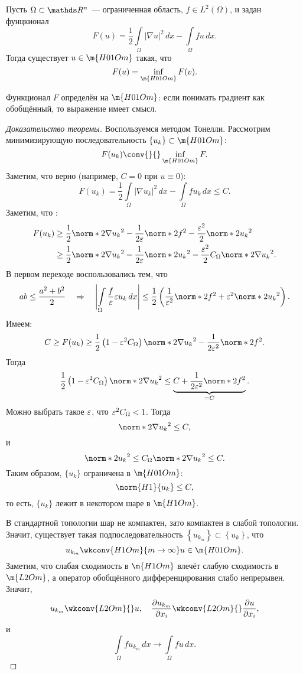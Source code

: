 \begin{theorem} Пусть $\Omega \subset \real^n$ --- ограниченная область, $f \in L^2(\Omega)$, и задан фунцкионал 
$$F(u) = \frac {1} {2} \int \limits_\Omega | \nabla u |^2 \, dx - \int \limits_\Omega fu \, dx.$$
Тогда существует $u \in \m{H01Om}$ такая, что 
$$ F(u) = \inf_{\m{H01Om}} F(v).$$
\end{theorem}
\begin{note} Функционал $F$ определён на $\m{H01Om}$: если понимать градиент как обобщённый, то выражение имеет смысл.
\end{note}
\begin{proof}[Доказательство теоремы]
Воспользуемся методом Тонелли. Рассмотрим минимизирующую последовательность $\{ u_k \} \subset \m{H01Om}$:
$$ F(u_k) \conv{}{} \inf_{\m{H01Om}} F.$$
Заметим, что верно (например, $C = 0$ при $u \equiv 0$):
$$F(u_k) = \frac {1} {2} \int \limits_\Omega | \nabla u_k |^2 \, dx - \int \limits_\Omega f u_k \, dx \leq C.$$
Заметим, что :
\begin{align*}
F(u_k) &\geq \frac {1} {2} \norm*{2}{\nabla u_k}^2 - \frac{1} {2 \eps} \norm*{2}{f}^2 - \frac{\eps^2}{2} \norm*{2}{u_k}^2 \\
& \geq \frac {1} {2} \norm*{2}{ \nabla u_k }^2 - \frac {1} {2\eps} \norm*{2}{ u_k}^2 - \frac {\eps^2} {2} C_\Omega \norm*{2}{ \nabla u_k}^2.
\end{align*}
В первом переходе воспользовались тем, что 
$$ ab \leq \frac {a^2 + b^2} {2} \quad \Rightarrow \quad \Biggl\lvert \int \limits_\Omega \frac {f} {\eps} \eps u_k \, dx \Biggr\rvert \leq \frac {1} {2} \left( \frac {1} {\eps^2} \norm*{2}{f}^2 + \eps^2 \norm*{2}{u_k}^2 \right).$$
Имеем:
$$C \geq F(u_k) \geq \frac {1} {2} \left(1 - \eps^2 C_\Omega \right) \norm*{2}{ \nabla u_k }^2 - \frac {1} {2 \eps^2} \norm*{2}{f}^2.$$
Тогда
$$ \frac {1} {2} \left( 1 - \eps^2 C_\Omega \right) \norm*{2}{ \nabla u_k}^2 \leq \underbrace {C + \frac {1} {2 \eps^2} \norm*{2}{f}^2}_{=C}.$$
Можно выбрать такое $\varepsilon$, что $ \varepsilon^2 C_\Omega < 1$. Тогда 
$$ \norm*{2}{\nabla u_k}^2 \leq C,$$
и
$$ \norm*{2}{u_k}^2 \leq C_\Omega \norm*{2}{ \nabla u_k}^2 \leq C.$$
Таким образом, $\{ u_k \}$ ограничена в $\m{H01Om}$:
$$ \norm{H1}{u_k} \leq C,$$ 
то есть, $\{ u_k \}$ лежит в некотором шаре в $\m{H1Om}$.

В стандартной топологии шар не компактен, зато компактен в слабой топологии. Значит, существует такая подпоследовательность $\left\{ u_{k_m} \right\} \subset \left\{ u_k \right\}$, что 
$$u_{k_m} \wkconv{H1Om}{m \to \infty} u \in \m{H01Om}.$$ 
Заметим, что слабая сходимость в $\m{H1Om}$ влечёт слабую сходимость в $\m{L2Om}$, а оператор обобщённого дифференцирования слабо непрерывен. Значит,
$$ u_{k_m} \wkconv{L2Om}{} u, \quad \pder[u_{k_m}]{x_i} \wkconv{L2Om}{} \pder[u]{x_i},$$
и
$$ \int \limits_\Omega f u_{k_m} \, dx \longrightarrow \int \limits_\Omega fu \, dx.$$


\end{proof}
